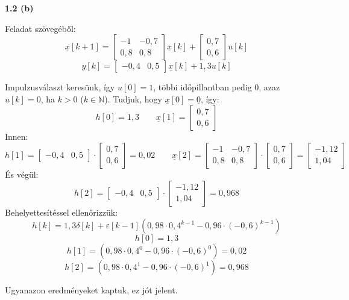 \documentclass[12pt,a4paper]{article}
\newcommand\uline[1]{\underline{#1}}
\begin{document}
\textbf{1.2 (b)}

Feladat szövegéből:
\[\uline{x}[k+1] = \left[\begin{matrix}-1 & -0,7\\0,8 & 0,8\end{matrix}\right]\uline{x}[k] + \left[\begin{matrix}0,7\\0,6\end{matrix}\right]u[k]\]
\[y[k] = \left[\begin{matrix}-0,4 & 0,5\end{matrix}\right]\uline{x}[k] + 1,3u[k]\]

Impulzusválaszt keresünk, így $u[0]=1$, többi időpillantban pedig 0, azaz $u[k]=0$, ha $k>0$ ($k\in \mathbb{N}$).
Tudjuk, hogy $\uline{x}[0]=\uline{0}$, így:
\[h[0] = 1,3 \qquad \uline{x}[1] = \left[\begin{matrix}0,7\\ 0,6\end{matrix}\right]\]
Innen:
\[h[1] = \left[\begin{matrix}-0,4 & 0,5\end{matrix}\right]\cdot\left[\begin{matrix}0,7\\ 0,6\end{matrix}\right] = 0,02 \qquad \uline{x}[2]=\left[\begin{matrix}-1 & -0,7\\0,8 & 0,8\end{matrix}\right]\cdot\left[\begin{matrix}0,7\\ 0,6\end{matrix}\right]=\left[\begin{matrix}-1,12\\ 1,04\end{matrix}\right]\]
És végül:
\[h[2] = \left[\begin{matrix}-0,4 & 0,5\end{matrix}\right]\cdot\left[\begin{matrix}-1,12\\ 1,04\end{matrix}\right] = 0,968\]
Behelyettesítéssel ellenőrizzük:
\[h[k] = 1,3\delta[k]+\varepsilon[k-1]\left(0,98\cdot 0,4^{k-1}-0,96\cdot (-0,6)^{k-1}\right)\]
\[h[0] = 1,3\]
\[h[1] = \left(0,98\cdot 0,4^{0}-0,96\cdot (-0,6)^{0}\right)=0,02\]
\[h[2] = \left(0,98\cdot 0,4^{1}-0,96\cdot (-0,6)^{1}\right)=0,968\]

Ugyanazon eredményeket kaptuk, ez jót jelent.\\
\end{document}
